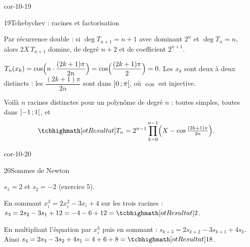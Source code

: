 \begin{blocLivre}{cor-10-19}
\begin{corrige}{19}{Tchebychev : racines et factorisation}
\begin{questions}
  \item Par récurrence double : si $\deg T_{n+1}=n+1$ avec dominant
    $2^{n}$ et $\deg T_n=n$, alors $2X\,T_{n+1}$ domine, de degré $n+2$
    et de coefficient $2^{n+1}$.
  \item $T_n(x_k)=\cos\Bigl(n\cdot\dfrac{(2k+1)\pi}{2n}\Bigr)
    =\cos\Bigl(\dfrac{(2k+1)\pi}{2}\Bigr)=0$. Les $x_k$ sont deux à deux
    distincts : les $\dfrac{(2k+1)\pi}{2n}$ sont dans $\mathopen{]}0\,{;}\,\pi\mathclose{[}$, où
    $\cos$ est injective.
  \item Voilà $n$ racines distinctes pour un polynôme de degré $n$ :
    toutes simples, toutes dans $\mathopen{]}-1\,{;}\,1\mathclose{[}$, et
    \[
      \res{T_n=2^{n-1}\prod_{k=0}^{n-1}
      \Bigl(X-\cos\tfrac{(2k+1)\pi}{2n}\Bigr)}.
    \]
\end{questions}
\end{corrige}
\end{blocLivre}

\begin{blocLivre}{cor-10-20}
\begin{corrige}{20}{Sommes de Newton}
\begin{questions}
  \item $s_1=2$ et $s_2=-2$ (exercice 5).
  \item En sommant $x_i^{3}=2x_i^{2}-3x_i+4$ sur les trois racines :
    $s_3=2s_2-3s_1+12=-4-6+12=\res{2}$.
  \item En multipliant l'équation par $x_i^{k}$ puis en sommant :
    $s_{k+3}=2s_{k+2}-3s_{k+1}+4s_k$. Ainsi
    $s_4=2s_3-3s_2+4s_1=4+6+8=\res{18}$.
\end{questions}
\end{corrige}
\end{blocLivre}

